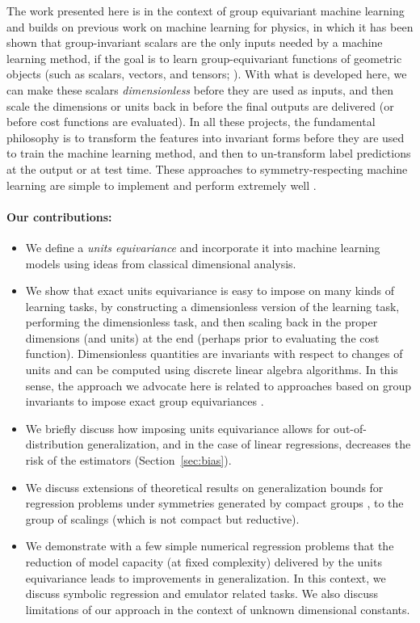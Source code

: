 \documentclass[twoside,11pt]{article}
\newcommand{\sectionname}{Section}
\newcommand{\secref}[1]{\sectionname~\ref{#1}}
\begin{document}
The work presented here is in the context of group equivariant machine learning \citep{cohen2016group, maron2018invariant, kondor2018n} and builds on previous work on machine learning for physics, in which it has been shown that group-invariant scalars are the only inputs needed by a machine learning method, if the goal is to learn group-equivariant functions of geometric objects (such as scalars, vectors, and tensors; \citealt{villar, yao}).
With what is developed here, we can make these scalars \emph{dimensionless} before they are used as inputs, and then scale the dimensions or units back in before the final outputs are delivered (or before cost functions are evaluated).
In all these projects, the fundamental philosophy is to transform the features into invariant forms before they are used to train the machine learning method, and then to un-transform label predictions at the output or at test time.
These approaches to symmetry-respecting machine learning are simple to implement and perform extremely well \citep{yao}.

\paragraph{Our contributions:}\nopagebreak\begin{itemize}
\item 
We define a \emph{units equivariance} and incorporate it into machine learning models using ideas from classical dimensional analysis.
\item
We show that exact units equivariance is easy to impose on many kinds of learning tasks, by constructing a dimensionless version of the learning task, performing the dimensionless task, and then scaling back in the proper dimensions (and units) at the end (perhaps prior to evaluating the cost function).
Dimensionless quantities are invariants with respect to changes of units and can be computed using discrete linear algebra algorithms.
In this sense, the approach we advocate here is related to approaches based on group invariants to impose exact group equivariances \citep{villar}.
\item 
We briefly discuss how imposing units equivariance allows for out-of-distribution generalization, and in the case of linear regressions, decreases the risk of the estimators (\secref{sec:bias}). 
\item
We discuss extensions of theoretical results on generalization bounds for regression problems under symmetries generated by compact groups \citep{elesedy2021provably}, to the group of scalings (which is not compact but reductive).  
\item
We demonstrate with a few simple numerical regression problems that the reduction of model capacity (at fixed complexity) delivered by the units equivariance leads to improvements in generalization.
In this context, we discuss symbolic regression and emulator related tasks. We also discuss limitations of our approach in the context of unknown dimensional constants.
\end{itemize}
\end{document}
